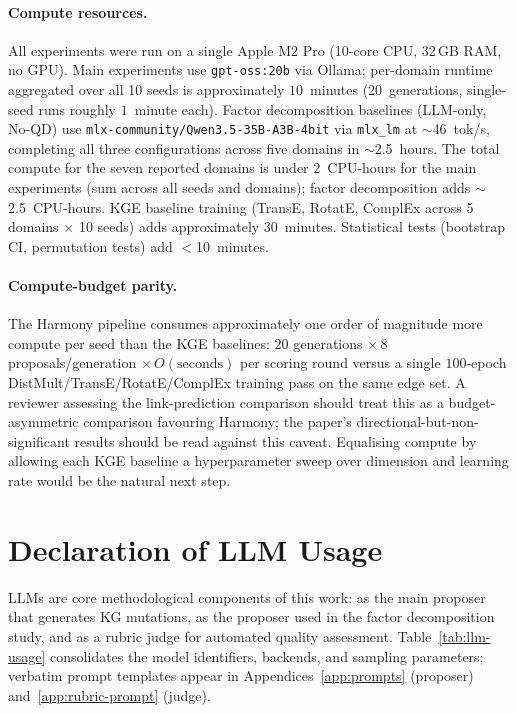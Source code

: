 \paragraph{Compute resources.}
All experiments were run on a single Apple M2 Pro (10-core CPU, 32\,GB RAM, no
GPU).  Main experiments use \texttt{gpt-oss:20b} via Ollama; per-domain
runtime aggregated over all 10 seeds is approximately $10$~minutes
(20~generations, single-seed runs roughly $1$~minute each).  Factor
decomposition baselines (LLM-only, No-QD) use
\texttt{mlx-community/Qwen3.5-35B-A3B-4bit} via \texttt{mlx\_lm} at
$\sim$46~tok/s, completing all three configurations across five domains
in $\sim$2.5~hours.  The total compute for the seven reported domains is
under $2$~CPU-hours for the main experiments (sum across all seeds and
domains); factor decomposition adds $\sim$2.5~CPU-hours.
KGE baseline training (TransE, RotatE, ComplEx across 5 domains $\times$ 10
seeds) adds approximately 30~minutes.  Statistical tests (bootstrap CI,
permutation tests) add $<$10~minutes.

\paragraph{Compute-budget parity.}
The Harmony pipeline consumes approximately one order of magnitude more
compute per seed than the KGE baselines: $20$ generations $\times\,8$
proposals/generation $\times\,O(\text{seconds})$ per scoring round
versus a single $100$-epoch DistMult/TransE/RotatE/ComplEx training
pass on the same edge set.  A reviewer assessing the link-prediction
comparison should treat this as a budget-asymmetric comparison
favouring Harmony; the paper's directional-but-non-significant results
should be read against this caveat.  Equalising compute by allowing
each KGE baseline a hyperparameter sweep over dimension and learning
rate would be the natural next step.

\section{Declaration of LLM Usage}\label{app:llm-decl}

LLMs are core methodological components of this work: as the main proposer
that generates KG mutations, as the proposer used in the factor decomposition
study, and as a rubric judge for automated quality assessment.
Table~\ref{tab:llm-usage} consolidates the model identifiers, backends, and
sampling parameters; verbatim prompt templates appear in
Appendices~\ref{app:prompts} (proposer) and~\ref{app:rubric-prompt} (judge).


